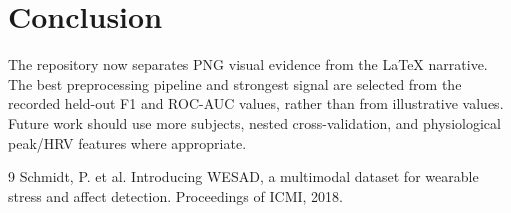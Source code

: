 \documentclass[11pt,a4paper]{article}
\begin{document}
\section{Conclusion}
The repository now separates PNG visual evidence from the LaTeX narrative. The best preprocessing pipeline and strongest signal are selected from the recorded held-out F1 and ROC-AUC values, rather than from illustrative values. Future work should use more subjects, nested cross-validation, and physiological peak/HRV features where appropriate.

\begin{thebibliography}{9}
 Schmidt, P. et al. Introducing WESAD, a multimodal dataset for wearable stress and affect detection. Proceedings of ICMI, 2018.
\end{thebibliography}
\end{document}
